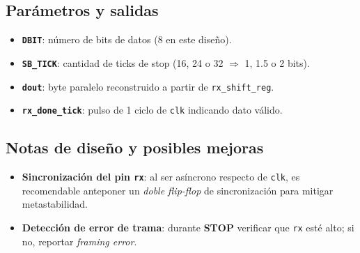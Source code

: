 \subsection{Parámetros y salidas}
\begin{itemize}
    \item \textbf{\texttt{DBIT}}: número de bits de datos (8 en este diseño).
    \item \textbf{\texttt{SB\_TICK}}: cantidad de ticks de stop (16, 24 o 32 $\Rightarrow$ 1, 1.5 o 2 bits).
    \item \textbf{\texttt{dout}}: byte paralelo reconstruido a partir de \texttt{rx\_shift\_reg}.
    \item \textbf{\texttt{rx\_done\_tick}}: pulso de 1 ciclo de \texttt{clk} indicando dato válido.
\end{itemize}

\subsection{Notas de diseño y posibles mejoras}
\begin{itemize}
    \item \textbf{Sincronización del pin \texttt{rx}}: al ser asíncrono respecto de \texttt{clk}, es recomendable anteponer un \emph{doble flip-flop} de sincronización para mitigar metastabilidad.
    \item \textbf{Detección de error de trama}: durante \textbf{STOP} verificar que \texttt{rx} esté alto; si no, reportar \emph{framing error}.
\end{itemize}
